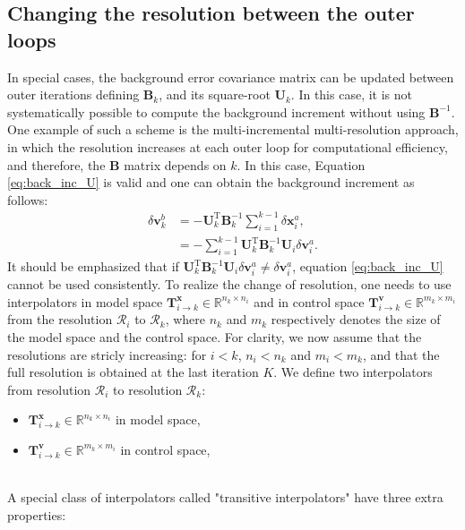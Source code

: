 \documentclass[npg, manuscript]{copernicus}
\begin{document}
\subsection{Changing the resolution between the outer loops}
In special cases, the background error covariance matrix can be updated between outer iterations defining $\mathbf{B}_k$, and its square-root $\mathbf{U}_k$. In this case, it is not systematically possible to compute the background increment without using $\mathbf{B}^{-1}$. One example of such a scheme is the multi-incremental multi-resolution approach, in which the resolution increases at each outer loop for computational efficiency, and therefore, the $\mathbf{B}$ matrix depends on $k$. In this case, Equation \eqref{eq:back_inc_U} is valid and one can obtain the background increment as follows:
\begin{align}
\label{eq:back_inc_U_diff}
\delta \mathbf{v}^b_k & = - \mathbf{U}_k^\mathrm{T} \mathbf{B}_k^{-1} \sum_{i=1}^{k-1} \delta \mathbf{x}^a_i, \nonumber \\
& = - \sum_{i=1}^{k-1} \mathbf{U}_k^\mathrm{T} \mathbf{B}_k^{-1} \mathbf{U}_i \delta \mathbf{v}^a_i.
\end{align}
It should be emphasized that if $\mathbf{U}_k^\mathrm{T} \mathbf{B}_k^{-1} \mathbf{U}_i \delta \mathbf{v}^a_i \ne \delta \mathbf{v}^a_i$, equation \eqref{eq:back_inc_U} cannot be used consistently. To realize the change of resolution, one needs to use interpolators in model space $\mathbf{T}^\mathbf{x}_{i \rightarrow k} \in \mathbb{R}^{n_k \times n_i}$ and in control space $\mathbf{T}^\mathbf{v}_{i \rightarrow k} \in \mathbb{R}^{m_k \times m_i}$ from the resolution $\mathcal{R}_i$ to $\mathcal{R}_k$, where $n_k$ and $m_k$ respectively denotes the size of the model space and the control space.
For clarity, we now assume that the resolutions are stricly increasing: for $i < k$, $n_i < n_k$ and $m_i < m_k$, and that the full resolution is obtained at the last iteration $K$. We define two interpolators from resolution $\mathcal{R}_i$ to resolution $\mathcal{R}_k$:
\begin{itemize}
\item $\mathbf{T}^\mathbf{x}_{i \rightarrow k} \in \mathbb{R}^{n_k \times n_i}$ in model space,
\item $\mathbf{T}^\mathbf{v}_{i \rightarrow k} \in \mathbb{R}^{m_k \times m_i}$ in control space,
\end{itemize}
$  $\\
A special class of interpolators called "transitive interpolators" have three extra properties:
\end{document}
